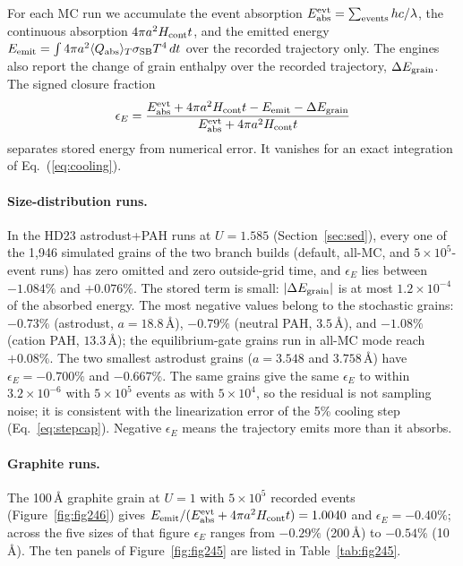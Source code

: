 \documentclass{my_memo}
\newcommand{\QplT}{\langle Q_{\rm abs} \rangle_T}
\newcommand{\sigmaSB}{\sigma_{\rm SB}}
\begin{document}
For each MC run we accumulate the event absorption
$E_{\rm abs}^{\rm evt}=\sum_{\rm events} hc/\lambda$, the continuous
absorption $4\pi a^2 H_{\rm cont}t$, and the emitted energy
$E_{\rm emit} = \int 4\pi a^2 \QplT \sigmaSB T^4\,dt$ over the
recorded trajectory only. The engines also report the change of
grain enthalpy over the recorded trajectory, $\Delta E_{\rm grain}$.
The signed closure fraction
\begin{equation}\label{eq:closure}
\epsilon_E = \frac{E_{\rm abs}^{\rm evt}+4\pi a^2H_{\rm cont}t
-E_{\rm emit}-\Delta E_{\rm grain}}{E_{\rm abs}^{\rm evt}+4\pi a^2H_{\rm cont}t}
\end{equation}
separates stored energy from numerical error. It vanishes for an exact
integration of Eq.~(\ref{eq:cooling}).

\paragraph{Size-distribution runs.} In the HD23 astrodust+PAH runs at
$U=1.585$ (Section~\ref{sec:sed}), every one of the 1,946 simulated
grains of the two branch builds (default, all-MC, and
$5\times10^5$-event runs) has zero omitted and zero outside-grid time,
and $\epsilon_E$ lies between $-1.084\%$ and $+0.076\%$. The stored
term is small: $|\Delta E_{\rm grain}|$ is at most $1.2\times10^{-4}$
of the absorbed energy. The most negative values belong to the
stochastic grains: $-0.73\%$ (astrodust, $a=18.8\,\textrm{\AA}$),
$-0.79\%$ (neutral PAH, $3.5\,\textrm{\AA}$), and $-1.08\%$
(cation PAH, $13.3\,\textrm{\AA}$); the equilibrium-gate grains run
in all-MC mode reach $+0.08\%$. The two smallest astrodust grains
($a=3.548$ and $3.758\,\textrm{\AA}$) have $\epsilon_E=-0.700\%$ and
$-0.667\%$. The same grains give the same $\epsilon_E$ to within
$3.2\times10^{-6}$ with $5\times10^5$ events as with $5\times10^4$, so
the residual is not sampling noise; it is consistent with the
linearization error of the 5\% cooling step (Eq.~\ref{eq:stepcap}).
Negative $\epsilon_E$ means the trajectory emits more than it absorbs.

\paragraph{Graphite runs.} The 100\,\AA{} graphite grain at $U=1$
with $5\times10^5$ recorded events (Figure~\ref{fig:fig246}) gives
$E_{\rm emit}/(E_{\rm abs}^{\rm evt}+4\pi a^2H_{\rm cont}t)=1.0040$ and
$\epsilon_E=-0.40\%$; across the five sizes of that figure
$\epsilon_E$ ranges from $-0.29\%$ (200\,\AA) to $-0.54\%$ (10\,\AA).
The ten panels of Figure~\ref{fig:fig245} are listed in
Table~\ref{tab:fig245}.
\end{document}
